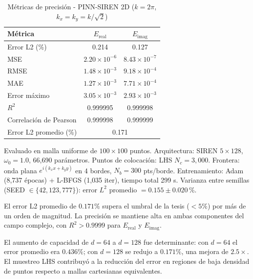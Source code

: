 \begin{table}[htbp]
\centering
\begin{threeparttable}
\caption{Métricas de precisión - PINN-SIREN 2D ($k = 2\pi$, $k_x = k_y = k/\sqrt{2}$)}
\label{tab:resultados2d}
\begin{tabular}{lcc}
\toprule
Métrica & $E_{\mathrm{real}}$ & $E_{\mathrm{imag}}$ \\
\midrule
Error L2 (\%)          & 0.214 & 0.127 \\
MSE                    & $2.20 \times 10^{-6}$ & $8.43 \times 10^{-7}$ \\
RMSE                   & $1.48 \times 10^{-3}$ & $9.18 \times 10^{-4}$ \\
MAE                    & $1.27 \times 10^{-3}$ & $7.71 \times 10^{-4}$ \\
Error máximo           & $3.05 \times 10^{-3}$ & $2.93 \times 10^{-3}$ \\
$R^2$                  & 0.999995 & 0.999998 \\
Correlación de Pearson & 0.999998 & 0.999999 \\
\midrule
Error L2 promedio (\%) & \multicolumn{2}{c}{0.171} \\
\bottomrule
\end{tabular}
\begin{tablenotes}
\small
\item Evaluado en malla uniforme de $100 \times 100$ puntos.
      Arquitectura: SIREN $5 \times 128$, $\omega_0 = 1.0$, 66{,}690 parámetros.
      Puntos de colocación: LHS $N_c = 3{,}000$.
      Frontera: onda plana $e^{i(k_x x + k_y y)}$ en 4 bordes, $N_b = 300$ pts/borde.
      Entrenamiento: Adam (8{,}737 épocas) + L-BFGS (1{,}035 iter), tiempo total 299 s.
      Varianza entre semillas (SEED $\in \{42, 123, 777\}$):
      error $L^2$ promedio $= 0.155 \pm 0.020$\,\%.
\end{tablenotes}
\end{threeparttable}
\end{table}

El error L2 promedio de $0.171\%$ supera el umbral de la tesis ($< 5\%$) por más de un
orden de magnitud. La precisión se mantiene alta en ambas componentes del campo complejo,
con $R^2 > 0.9999$ para $E_{\mathrm{real}}$ y $E_{\mathrm{imag}}$.

El aumento de capacidad de $d = 64$ a $d = 128$ fue determinante: con $d = 64$ el error
promedio era $0.436\%$; con $d = 128$ se redujo a $0.171\%$, una mejora de $2.5\times$.
El muestreo LHS contribuyó a la reducción del error en regiones de baja densidad de
puntos respecto a mallas cartesianas equivalentes.


